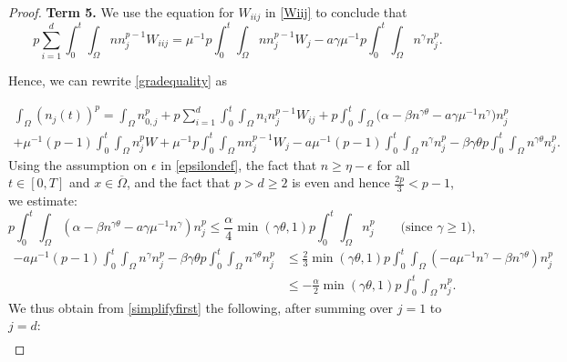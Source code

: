 \documentclass[12pt]{article}
\theoremstyle{plain}
\begin{document}
\begin{proof}
\medskip

\noindent \textbf{Term 5.} We use the equation for $W_{iij}$ in \eqref{Wiij} to conclude that
    \begin{equation*}
    p \sum_{i = 1}^{d} \int_{0}^{t} \int_{\Omega} nn_{j}^{p - 1} W_{iij} = \mu^{-1}p \int_{0}^{t} \int_{\Omega} nn_{j}^{p - 1} W_{j} - a\gamma \mu^{-1} p \int_{0}^{t} \int_{\Omega} n^{\gamma} n_{j}^{p}.
    \end{equation*}

\medskip

Hence, we can rewrite \eqref{gradequality} as

\begin{multline}\label{simplifyfirst}
\int_{\Omega} (n_{j}(t))^{p} = \int_{\Omega} n_{0, j}^{p} + p\sum_{i = 1}^{d} \int_{0}^{t} \int_{\Omega} n_{i}n_{j}^{p - 1} W_{ij} + p\int_{0}^{t} \int_{\Omega} \Big(\alpha - \beta n^{\gamma \theta} - a\gamma \mu^{-1}n^{\gamma}\Big) n_{j}^{p} \\
+ \mu^{-1}(p - 1) \int_{0}^{t} \int_{\Omega} n_{j}^{p}W + \mu^{-1}p \int_{0}^{t} \int_{\Omega} nn^{p - 1}_{j}W_{j} - a\mu^{-1}(p - 1) \int_{0}^{t} \int_{\Omega} n^{\gamma} n_{j}^{p} - \beta\gamma \theta p \int_{0}^{t} \int_{\Omega} n^{\gamma \theta} n^{p}_{j}.
\end{multline}
Using the assumption on $\epsilon$ in \eqref{epsilondef}, the fact that $n \ge \eta - \epsilon$ for all $t \in [0, T]$ and $x \in \overline{\Omega}$, and the fact that $p > d \ge 2$ is even and hence $\displaystyle \frac{2p}{3} < p - 1$, we estimate:
\begin{equation*}
p \int_{0}^{t} \int_{\Omega} \left(\alpha - \beta n^{\gamma \theta} - a\gamma \mu^{-1}n^{\gamma}\right)n^{p}_{j} \le \frac{\alpha}{4}\min(\gamma \theta, 1)p \int_{0}^{t} \int_{\Omega} n_{j}^{p} \qquad \text{(since $\gamma \ge 1$)},
\end{equation*}
\begin{align*}
-a\mu^{-1}(p - 1) \int_{0}^{t} \int_{\Omega} n^{\gamma} n_{j}^{p} - \beta \gamma \theta p \int_{0}^{t} \int_{\Omega} n^{\gamma \theta} n_{j}^{p} &\le \frac{2}{3}\min(\gamma \theta, 1) p \int_{0}^{t} \int_{\Omega} (-a\mu^{-1}n^{\gamma} - \beta n^{\gamma \theta})n^{p}_{j} \\
&\le -\frac{\alpha}{2}\min(\gamma \theta, 1) p \int_{0}^{t} \int_{\Omega} n^{p}_{j}.
\end{align*}
We thus obtain from \eqref{simplifyfirst} the following, after summing over $j = 1$ to $j = d$:
\begin{multline}\label{apriorimid}

\end{multline}
\end{proof}
\end{document}
